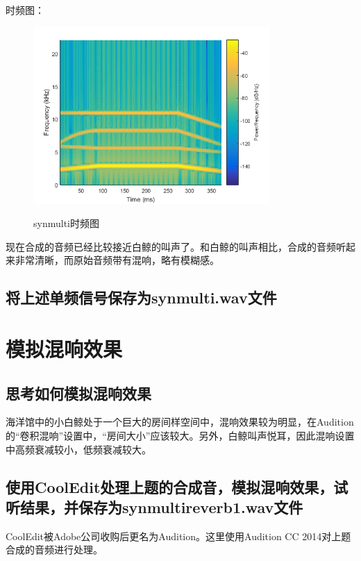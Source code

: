 \documentclass{article}
\begin{document}
            时频图：
            \begin{figure}[htb]
                \centering
                \includegraphics[width=9cm]{figure12.png}
                \label{fig:synmulti-ft}\caption{synmulti时频图}
            \end{figure}

            现在合成的音频已经比较接近白鲸的叫声了。和白鲸的叫声相比，合成的音频听起来非常清晰，而原始音频带有混响，略有模糊感。

        \subsection{将上述单频信号保存为synmulti.wav文件}

    \section{模拟混响效果}
        \subsection{思考如何模拟混响效果}
            海洋馆中的小白鲸处于一个巨大的房间样空间中，混响效果较为明显，在Audition的“卷积混响”设置中，“房间大小”应该较大。另外，白鲸叫声悦耳，因此混响设置中高频衰减较小，低频衰减较大。

        \subsection{使用CoolEdit处理上题的合成音，模拟混响效果，试听结果，并保存为synmultireverb1.wav文件}
            CoolEdit被Adobe公司收购后更名为Audition。这里使用Audition CC 2014对上题合成的音频进行处理。
            
\end{document}
